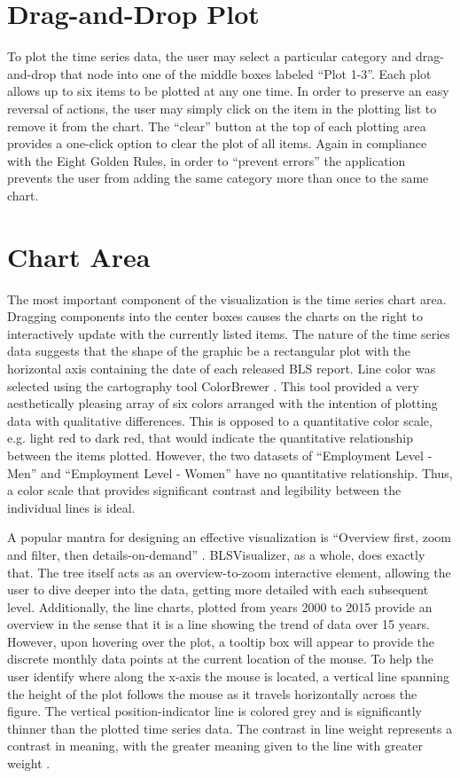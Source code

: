 \documentclass[journal]{IEEEtran}
\begin{document}
{\section{Drag-and-Drop Plot}

To plot the time series data, the user may select a particular category and drag-and-drop that node into one of the middle boxes labeled ``Plot 1-3''. Each plot allows up to six items to be plotted at any one time. In order to preserve an easy reversal of actions, the user may simply click on the item in the plotting list to remove it from the chart. The ``clear'' button at the top of each plotting area provides a one-click option to clear the plot of all items. Again in compliance with the Eight Golden Rules, in order to ``prevent errors'' the application prevents the user from adding the same category more than once to the same chart. 

\section{Chart Area}

The most important component of the visualization is the time series chart area. Dragging components into the center boxes causes the charts on the right to interactively update with the currently listed items. The nature of the time series data suggests that the shape of the graphic be a rectangular plot with the horizontal axis containing the date of each released BLS report. Line color was selected using the cartography tool ColorBrewer \cite{Harrower2003}. This tool provided a very aesthetically pleasing array of six colors arranged with the intention of plotting data with qualitative differences. This is opposed to a quantitative color scale, e.g. light red to dark red, that would indicate the quantitative relationship between the items plotted. However, the two datasets of ``Employment Level - Men'' and ``Employment Level - Women'' have no quantitative relationship. Thus, a color scale that provides significant contrast and legibility between the individual lines is ideal.  

A popular mantra for designing an effective visualization is ``Overview first, zoom and filter, then details-on-demand'' \cite{Shneiderman1996}. BLSVisualizer, as a whole, does exactly that. The tree itself acts as an overview-to-zoom interactive element, allowing the user to dive deeper into the data, getting more detailed with each subsequent level. Additionally, the line charts, plotted from years 2000 to 2015 provide an overview in the sense that it is a line showing the trend of data over 15 years. However, upon hovering over the plot, a tooltip box will appear to provide the discrete monthly data points at the current location of the mouse. To help the user identify where along the x-axis the mouse is located, a vertical line spanning the height of the plot follows the mouse as it travels horizontally across the figure. The vertical position-indicator line is colored grey and is significantly thinner than the plotted time series data. The contrast in line weight represents a contrast in meaning, with the greater meaning given to the line with greater weight \cite{Tufte}.

}
\end{document}
